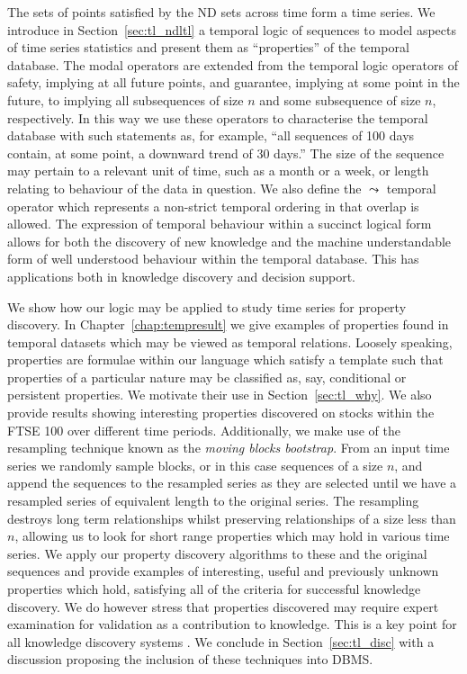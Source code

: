 \smallskip

The sets of points satisfied by the ND sets across time form a time
series. We introduce in Section~\ref{sec:tl_ndltl} a temporal logic of
sequences to model aspects of
time series statistics and present them as ``properties'' of the
temporal database. The modal operators are extended from the temporal
logic operators of safety, implying at all future points, and
guarantee, implying at some point in the future, to implying all
subsequences of size $n$ and some subsequence of size $n$, respectively.  
In this way we use these operators to characterise
the temporal database with such statements as, for example, ``all
sequences of 100 days contain, at some point, a downward trend of 30
days.''  The size of the sequence may pertain to a relevant unit of
time, such as a month or a week, or length relating to behaviour of
the data in question. We also define the $\leadsto$ temporal operator which
represents a non-strict temporal ordering in that overlap is allowed.
The expression of temporal behaviour within a succinct logical
form allows for both the discovery of new knowledge and the machine
understandable form of well understood behaviour within the temporal
database. 
This has applications both in knowledge discovery and
decision support. 
\smallskip

We show how our logic may be applied to study time series for
property discovery. In Chapter~\ref{chap:tempresult} we give examples
of properties found in temporal
datasets which may be viewed as temporal relations. Loosely speaking,
properties are formulae within our language which satisfy a template
such that properties of a particular nature may be classified as, say,
conditional or persistent properties. We motivate their use in
Section~\ref{sec:tl_why}. 
We also provide
results showing interesting properties
discovered on stocks within the FTSE 100 over different
time periods. Additionally, we make use of the resampling technique
known as the {\em moving blocks bootstrap}. From an input time series we
randomly sample blocks, or in this case sequences of a size $n$, and
append the sequences to the resampled series as they are selected
until we have a resampled series of equivalent length to the original
series.  
The resampling destroys long term relationships whilst preserving
relationships of a size less than $n$, allowing us to
look for short range properties which may hold in various time series.
We apply our property discovery
algorithms to these and the original sequences and provide examples of
interesting,
useful and previously unknown properties which hold, satisfying all of
the criteria for successful knowledge discovery. We do however stress
that properties discovered may 
require expert examination for validation as a contribution to
knowledge. This is a key point for all knowledge discovery systems
\cite{fps96,man97}. We conclude in
Section~\ref{sec:tl_disc} with a
discussion proposing the inclusion of these techniques into DBMS.

